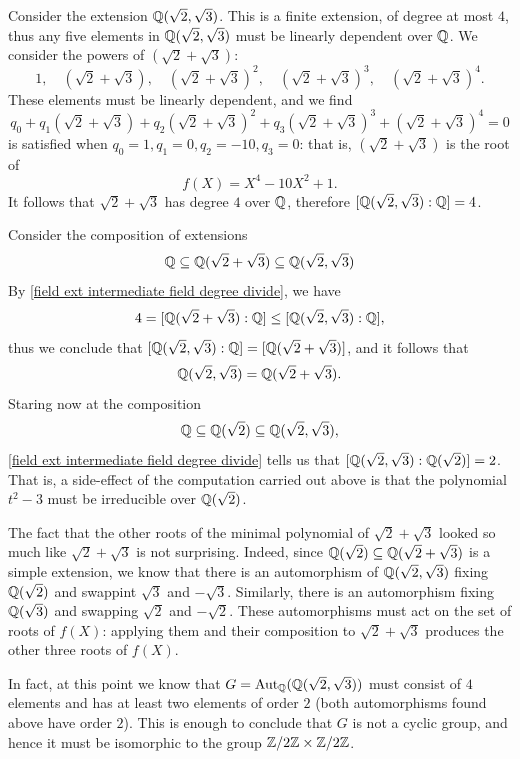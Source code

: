\begin{example}
Consider the extension $\mathbb{Q}(\sqrt{2},\sqrt{3})$. This is a finite extension, of degree at most $4$, thus any five elements in $\mathbb{Q}(\sqrt{2},\sqrt{3})$ must be linearly dependent over $\mathbb{Q}$. We consider the powers of $(\sqrt{2}+\sqrt{3})$:
\[1,\quad(\sqrt{2}+\sqrt{3}),\quad(\sqrt{2}+\sqrt{3})^2,\quad(\sqrt{2}+\sqrt{3})^3,\quad(\sqrt{2}+\sqrt{3})^4.\]
These elements must be linearly dependent, and we find
\[q_0+q_1(\sqrt{2}+\sqrt{3})+q_2(\sqrt{2}+\sqrt{3})^2+q_3(\sqrt{2}+\sqrt{3})^3+(\sqrt{2}+\sqrt{3})^4=0\]
is satisfied when $q_0=1,q_1=0,q_2=-10,q_3=0$: that is, $(\sqrt{2}+\sqrt{3})$ is the root of
\[f(X)=X^4-10X^2+1.\]
It follows that $\sqrt{2}+\sqrt{3}$ has degree $4$ over $\mathbb{Q}$, therefore $[\mathbb{Q}(\sqrt{2},\sqrt{3}):\mathbb{Q}]=4$.\par
Consider the composition of extensions
\[\mathbb{Q}\subseteq\mathbb{Q}(\sqrt{2}+\sqrt{3})\subseteq\mathbb{Q}(\sqrt{2},\sqrt{3})\]
By \cref{field ext intermediate field degree divide}, we have
\[4=[\mathbb{Q}(\sqrt{2}+\sqrt{3}):\mathbb{Q}]\leq[\mathbb{Q}(\sqrt{2},\sqrt{3}):\mathbb{Q}],\]
thus we conclude that $[\mathbb{Q}(\sqrt{2},\sqrt{3}):\mathbb{Q}]=[\mathbb{Q}(\sqrt{2}+\sqrt{3})]$, and it follows that
\[\mathbb{Q}(\sqrt{2},\sqrt{3})=\mathbb{Q}(\sqrt{2}+\sqrt{3}).\]
Staring now at the composition
\[\mathbb{Q}\subseteq\mathbb{Q}(\sqrt{2})\subseteq\mathbb{Q}(\sqrt{2},\sqrt{3}),\]
\cref{field ext intermediate field degree divide} tells us that $[\mathbb{Q}(\sqrt{2},\sqrt{3}):\mathbb{Q}(\sqrt{2})]=2$. That is, a side-effect of the computation carried out above is that the polynomial $t^2-3$ must be irreducible over $\mathbb{Q}(\sqrt{2})$.\par
The fact that the other roots of the minimal polynomial of $\sqrt{2}+\sqrt{3}$ looked so much like $\sqrt{2}+\sqrt{3}$ is not surprising. Indeed, since $\mathbb{Q}(\sqrt{2})\subseteq\mathbb{Q}(\sqrt{2}+\sqrt{3})$ is a simple extension, we know that there is an automorphism of $\mathbb{Q}(\sqrt{2},\sqrt{3})$ fixing $\mathbb{Q}(\sqrt{2})$ and swappint $\sqrt{3}$ and $-\sqrt{3}$. Similarly, there is an automorphism fixing $\mathbb{Q}(\sqrt{3})$ and swapping $\sqrt{2}$ and $-\sqrt{2}$. These automorphisms must act on the set of roots of $f(X)$: applying them and their composition to $\sqrt{2}+\sqrt{3}$ produces the other three roots of $f(X)$.\par
In fact, at this point we know that $G=\mathrm{Aut}_{\mathbb{Q}}(\mathbb{Q}(\sqrt{2},\sqrt{3}))$ must consist of $4$ elements and has at least two elements of order $2$ (both automorphisms found above have order $2$). This is enough to conclude that $G$ is not a cyclic group, and hence it must be isomorphic to the group $\mathbb{Z}/2\mathbb{Z}\times\mathbb{Z}/2\mathbb{Z}$.
\end{example}
